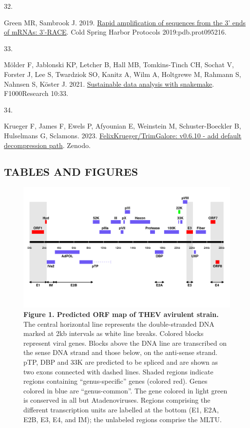 \documentclass[
]{article}
\newlength{\cslhangindent}
\newlength{\csllabelwidth}
\newenvironment{CSLReferences}[2] %
 {\begin{list}{}{%
  \setlength{\itemindent}{0pt}
  \setlength{\leftmargin}{0pt}
  \setlength{\parsep}{0pt}
  \ifodd #1
   \setlength{\leftmargin}{\cslhangindent}
   \setlength{\itemindent}{-1\cslhangindent}
  \fi
  \setlength{\itemsep}{#2\baselineskip}}}
 {\end{list}}
\newcommand{\CSLLeftMargin}[1]{\parbox[t]{\csllabelwidth}{\strut#1\strut}}
\newcommand{\CSLRightInline}[1]{\parbox[t]{\linewidth - \csllabelwidth}{\strut#1\strut}}
\begin{document}
\begin{CSLReferences}{0}{1}
\CSLLeftMargin{32. }%
\CSLRightInline{Green MR, Sambrook J. 2019.
\href{https://doi.org/10.1101/pdb.prot095216}{Rapid amplification of
sequences from the 3' ends of mRNAs: 3'-RACE}. Cold Spring Harbor
Protocols 2019:pdb.prot095216.}

\CSLLeftMargin{33. }%
\CSLRightInline{Mölder F, Jablonski KP, Letcher B, Hall MB,
Tomkins-Tinch CH, Sochat V, Forster J, Lee S, Twardziok SO, Kanitz A,
Wilm A, Holtgrewe M, Rahmann S, Nahnsen S, Köster J. 2021.
\href{https://doi.org/10.12688/f1000research.29032.2}{Sustainable data
analysis with snakemake}. F1000Research 10:33.}

\CSLLeftMargin{34. }%
\CSLRightInline{Krueger F, James F, Ewels P, Afyounian E, Weinstein M,
Schuster-Boeckler B, Hulselmans G, Sclamons. 2023.
\href{https://doi.org/10.5281/ZENODO.7598955}{FelixKrueger/TrimGalore:
v0.6.10 - add default decompression path}. Zenodo.}

\end{CSLReferences}

\setlength{\parindent}{0in}
\setlength{\leftskip}{0in}
\newpage

\newpage

\subsection{TABLES AND FIGURES}\label{tables-and-figures}

\begin{figure}
\centering
\includegraphics{results/r/figures/thev_orf_map.png}
\caption{\textbf{Figure 1. Predicted ORF map of THEV avirulent strain.}
The central horizontal line represents the double-stranded DNA marked at
2kb intervals as white line breaks. Colored blocks represent viral
genes. Blocks above the DNA line are transcribed on the sense DNA strand
and those below, on the anti-sense strand. pTP, DBP and 33K are
predicted to be spliced and are shown as two exons connected with dashed
lines. Shaded regions indicate regions containing ``genus-specific''
genes (colored red). Genes colored in blue are ``genus-common''. The
gene colored in light green is conserved in all but Atadenoviruses.
Regions comprising the different transcription units are labelled at the
bottom (E1, E2A, E2B, E3, E4, and IM); the unlabeled regions comprise
the MLTU.}
\end{figure}
\end{document}

